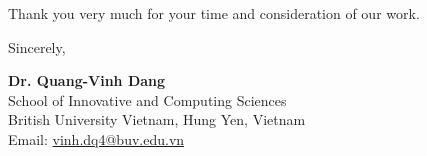 \documentclass[11pt]{article}
\begin{document}
\noindent
Thank you very much for your time and consideration of our work.

\vspace{1.5em}

\noindent
Sincerely,

\vspace{0.5em}
\noindent
\textbf{Dr. Quang-Vinh Dang} \\
School of Innovative and Computing Sciences \\
British University Vietnam, Hung Yen, Vietnam \\
Email: \href{mailto:vinh.dq4@buv.edu.vn}{vinh.dq4@buv.edu.vn}
\end{document}
